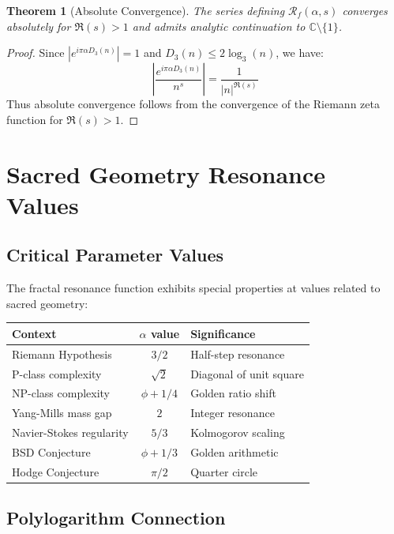 \documentclass[12pt,letterpaper]{article}
\newcommand{\C}{\mathbb{C}}
\newcommand{\fractalres}{\mathcal{R}_f}
\newcommand{\digitalsum}{D_3}
\newcommand{\goldenratio}{\phi}
\newtheorem{theorem}{Theorem}[section]
\begin{document}
\begin{theorem}[Absolute Convergence]
The series defining $\fractalres(\alpha, s)$ converges absolutely for $\Re(s) > 1$ and admits analytic continuation to $\C \setminus \{1\}$.
\end{theorem}

\begin{proof}
Since $|e^{i\pi\alpha\digitalsum(n)}| = 1$ and $\digitalsum(n) \leq 2\log_3(n)$, we have:
\begin{equation}
\left|\frac{e^{i\pi\alpha\digitalsum(n)}}{n^s}\right| = \frac{1}{|n|^{\Re(s)}}
\end{equation}
Thus absolute convergence follows from the convergence of the Riemann zeta function for $\Re(s) > 1$.
\end{proof}

\section{Sacred Geometry Resonance Values}

\subsection{Critical Parameter Values}

The fractal resonance function exhibits special properties at values related to sacred geometry:

\begin{center}
\begin{tabular}{|l|c|l|}
\hline
\textbf{Context} & \textbf{$\alpha$ value} & \textbf{Significance} \\
\hline
Riemann Hypothesis & $3/2$ & Half-step resonance \\
P-class complexity & $\sqrt{2}$ & Diagonal of unit square \\
NP-class complexity & $\goldenratio + 1/4$ & Golden ratio shift \\
Yang-Mills mass gap & $2$ & Integer resonance \\
Navier-Stokes regularity & $5/3$ & Kolmogorov scaling \\
BSD Conjecture & $\goldenratio + 1/3$ & Golden arithmetic \\
Hodge Conjecture & $\pi/2$ & Quarter circle \\
\hline
\end{tabular}
\end{center}

\subsection{Polylogarithm Connection}
\end{document}
